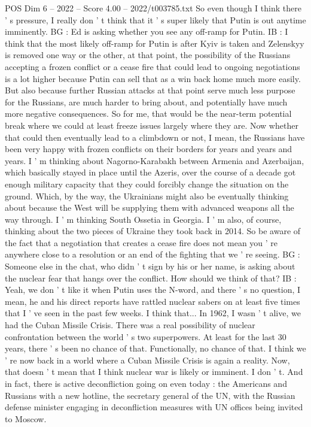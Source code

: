 \begin{textsample}{POS Dim 6 – 2022 – Score 4.00 – 2022/t003785.txt}
So even though I think there ' s pressure, I really don ' t think that it ' s super likely that Putin is out anytime imminently.
BG : Ed is asking whether you see any off-ramp for Putin.
IB : I think that the most likely off-ramp for Putin is after Kyiv is taken and Zelenskyy is removed one way or the other, at that point, the possibility of the Russians accepting a frozen conflict or a cease fire that could lead to ongoing negotiations is a lot higher because Putin can sell that as a win back home much more easily.
But also because further Russian attacks at that point serve much less purpose for the Russians, are much harder to bring about, and potentially have much more negative consequences.
So for me, that would be the near-term potential break where we could at least freeze issues largely where they are.
Now whether that could then eventually lead to a climbdown or not, I mean, the Russians have been very happy with frozen conflicts on their borders for years and years and years.
I ' m thinking about Nagorno-Karabakh between Armenia and Azerbaijan, which basically stayed in place until the Azeris, over the course of a decade got enough military capacity that they could forcibly change the situation on the ground.
Which, by the way, the Ukrainians might also be eventually thinking about because the West will be supplying them with advanced weapons all the way through.
I ' m thinking South Ossetia in Georgia.
I ' m also, of course, thinking about the two pieces of Ukraine they took back in 2014.
So be aware of the fact that a negotiation that creates a cease fire does not mean you ' re anywhere close to a resolution or an end of the fighting that we ' re seeing.
BG : Someone else in the chat, who didn ' t sign by his or her name, is asking about the nuclear fear that hangs over the conflict.
How should we think of that?
IB : Yeah, we don ' t like it when Putin uses the N-word, and there ' s no question, I mean, he and his direct reports have rattled nuclear sabers on at least five times that I ' ve seen in the past few weeks.
I think that...
In 1962, I wasn ' t alive, we had the Cuban Missile Crisis.
There was a real possibility of nuclear confrontation between the world ' s two superpowers.
At least for the last 30 years, there ' s been no chance of that.
Functionally, no chance of that.
I think we ' re now back in a world where a Cuban Missile Crisis is again a reality.
Now, that doesn ' t mean that I think nuclear war is likely or imminent.
I don ' t.
And in fact, there is active deconfliction going on even today : the Americans and Russians with a new hotline, the secretary general of the UN, with the Russian defense minister engaging in deconfliction measures with UN offices being invited to Moscow.

\end{textsample}
